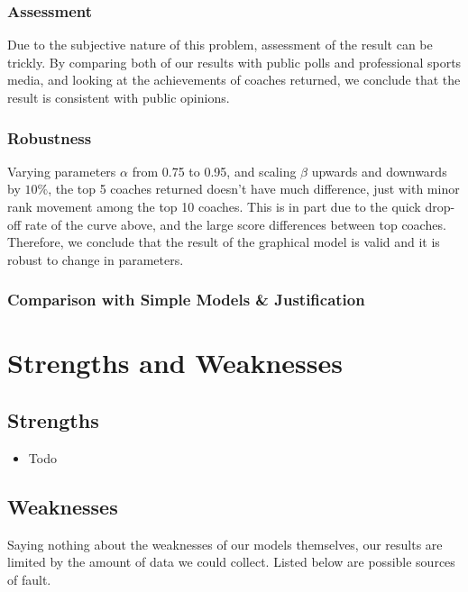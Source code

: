\documentclass[titlepage]{article}
\begin{document}
\subsubsection*{Assessment}

\noindent Due to the subjective nature of this problem, assessment of the result can be trickly. By comparing both of our results with public polls and professional sports media, and looking at the achievements of coaches returned, we conclude that the result is consistent with public opinions.

\subsubsection*{Robustness}

\noindent Varying parameters $\alpha$ from 0.75 to 0.95, and scaling $\beta$ upwards and downwards by $10\%$, the top 5 coaches returned doesn't have much difference, just with minor rank movement among the top 10 coaches. This is in part due to the quick drop-off rate of the curve above, and the large score differences between top coaches. Therefore, we conclude that the result of the graphical model is valid and it is robust to change in parameters.

\subsubsection*{Comparison with Simple Models \& Justification}

\section{Strengths and Weaknesses}
\subsection{Strengths}
\begin{itemize}
\item Todo
\end{itemize}
\subsection{Weaknesses}
Saying nothing about the weaknesses of our models themselves, our results are limited by the amount of data we could collect. Listed below are possible sources of fault.
\end{document}
